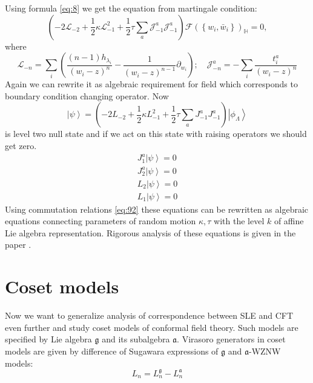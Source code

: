 \documentclass[a4paper]{jpconf}
\theoremstyle{definition}
\newcommand{\gf}{\mathfrak{g}}
\newcommand{\af}{\mathfrak{a}}
\theoremstyle{definition} \newtheorem{Def}{Definition}
\begin{document}
Using formula \eqref{eq:8} we get the equation from martingale condition:
\begin{equation*}
  \left(-2 \mathcal{L}_{-2}+\frac{1}{2}\kappa \mathcal{L}_{-1}^{2}+\frac{1}{2}\tau\sum_{a} \mathcal{J}^{a}_{-1} \mathcal{J}^{a}_{-1}\right)        \mathcal{F}(\left\{w_{i}, \bar w_{i}\right\})_{\mathbb{H}}=0,
\end{equation*}
where
\begin{equation*}
  \mathcal{L}_{-n}=\sum_{i}\left(\frac{(n-1)h_{\lambda_{i}}}{(w_{i}-z)^{n}}-\frac{1}{(w_{i}-z)^{n-1}}\partial_{w_{i}}\right);\quad \mathcal{J}^{a}_{{-n}}=-\sum_{i}\frac{t^{a}_{i}}{(w_{i}-z)^{n}}
\end{equation*}
Again we can rewrite it as algebraic requirement for  field  which corresponds to boundary condition changing operator. Now
\begin{equation*}
  \left| \psi\right>=\left(-2 L_{-2}+\frac{1}{2}\kappa L_{-1}^{2}+\frac{1}{2}\tau\sum_{a} J^{a}_{-1} J^{a}_{-1}\right) \left|\phi_{\Lambda}\right>    
\end{equation*}
is level two null state and if we act on this state with raising operators we should get zero.
\begin{eqnarray}
  J^{a}_{1} \left|\psi\right>=0\\
  J^{a}_{2}\left|\psi\right>=0\\
  L_{2}\left|\psi\right>=0\\
  L_{1}\left|\psi\right>=0
\end{eqnarray}
Using commutation relations \eqref{eq:92} these equations can be rewritten as algebraic equations connecting parameters of random motion $\kappa, \tau$ with the level $k$ of affine Lie algebra representation. Rigorous analysis of these equations is given in the paper \cite{alekseev2010sle}.

\section{Coset models}
\label{sec:coset-models}
Now we want to generalize analysis of correspondence between SLE and CFT even further and study coset models of conformal field theory\cite{Goddard198588}. Such models are specified by  Lie algebra $\gf$ and its subalgebra $\af$. 
Virasoro generators in coset models are given by difference of Sugawara expressions of $\gf$ and $\af$-WZNW models:
\begin{equation*}
  L_{n}=L_{n}^{\gf}-L_{n}^{\af}
\end{equation*}
\end{document}
